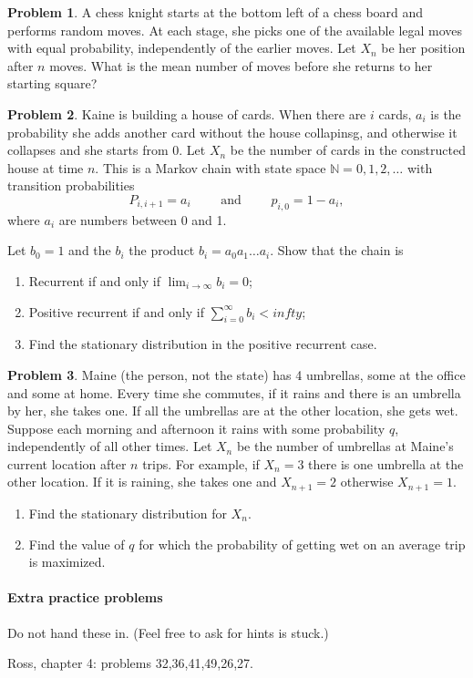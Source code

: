 \documentclass{article}
\newcommand{\N}{\mathbb N}
\theoremstyle{definition}
\newtheorem{problem}{Problem}
\begin{document}
\begin{problem}
  A chess knight starts at the bottom left of a chess board and performs random moves.
  At each stage, she picks one of the available legal moves with equal probability, independently of the earlier moves.
  Let $X_n$ be her position after $n$ moves.
  What is the mean number of moves before she returns to her starting square?
\end{problem}


\begin{problem}
  Kaine is building a house of cards.
  When there are $i$ cards, $a_i$ is the probability she adds another card without the house collapinsg, and otherwise it collapses and she starts from 0.
  Let $X_n$ be the number of cards in the constructed house at time $n$.
  This is a Markov chain with state space $\N = {0,1,2,\dots}$ with transition probabilities
  \[
    P_{i,i+1} = a_i \qquad \text{ and } \qquad p_{i,0} = 1-a_i, \]
  where $a_i$ are numbers between 0 and 1.

  Let $b_0 = 1$ and the $b_i$ the product $b_i = a_0a_1\dots a_i$.
  Show that the chain is
  \begin{enumerate}
  \item Recurrent if and only if $\lim_{i\to\infty} b_i = 0$;
  \item Positive recurrent if and only if $\sum_{i=0}^\infty b_i < infty$;
  \item Find the stationary distribution in the positive recurrent case.
  \end{enumerate}
\end{problem}


\begin{problem}
  Maine (the person, not the state) has 4 umbrellas, some at the office and some at home.
  Every time she commutes, if it rains and there is an umbrella by her, she takes one.
  If all the umbrellas are at the other location, she gets wet.
  Suppose each morning and afternoon it rains with some probability $q$, independently of all other times.
  Let $X_n$ be the number of umbrellas at Maine's current location after $n$ trips.
  For example, if $X_n=3$ there is one umbrella at the other location.
  If it is raining, she takes one and $X_{n+1}=2$ otherwise $X_{n+1}=1$.
  \begin{enumerate}
  \item Find the stationary distribution for $X_n$.
  \item Find the value of $q$ for which the probability of getting wet on an average trip is maximized.
  \end{enumerate}
\end{problem}


\paragraph{Extra practice problems}
Do not hand these in. (Feel free to ask for hints is stuck.)

Ross, chapter 4: problems 32,36,41,49,26,27.
\end{document}
